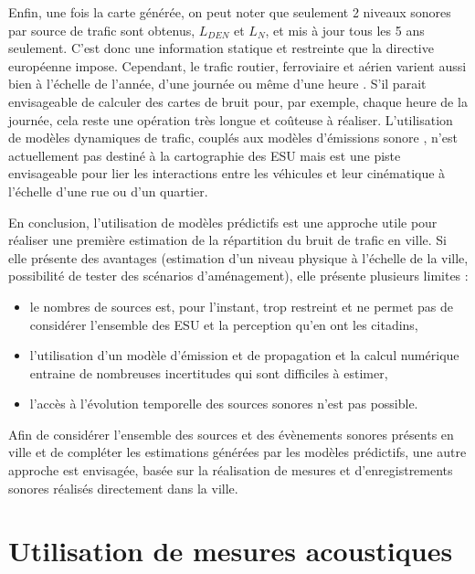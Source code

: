 
Enfin, une fois la carte générée, on peut noter que seulement 2 niveaux sonores par source de trafic sont obtenus, $L_{DEN}$ et $L_N$, et mis à jour tous les 5 ans seulement. C'est donc une information statique et restreinte que la directive européenne impose. Cependant, le trafic routier, ferroviaire et aérien varient aussi bien à l'échelle de l'année, d'une journée ou même d'une heure \cite{lv2015traffic}. S'il parait envisageable de calculer des cartes de bruit pour, par exemple, chaque heure de la journée, cela reste une opération très longue et coûteuse à réaliser.
L'utilisation de modèles dynamiques de trafic, couplés aux modèles d'émissions sonore  \cite{can2010traffic}, n'est actuellement pas destiné à la cartographie des ESU mais est une piste envisageable pour lier les interactions entre les véhicules et leur cinématique à l'échelle d'une rue ou d'un quartier.

En conclusion, l'utilisation de modèles prédictifs est une approche utile pour réaliser une première estimation de la répartition du bruit de trafic en ville. Si elle présente des avantages (estimation d'un niveau physique à l'échelle de la ville, possibilité de tester des scénarios d'aménagement), elle présente plusieurs limites :

\begin{itemize}
\item le nombres de  sources est, pour l'instant, trop restreint et ne permet pas de considérer l'ensemble des ESU et la perception qu'en ont les citadins,
\item l'utilisation d'un modèle d'émission et de propagation et la calcul numérique entraine de nombreuses incertitudes qui sont difficiles à estimer,
\item l'accès à l'évolution temporelle des sources sonores n'est pas possible.
\end{itemize}

Afin de considérer l'ensemble des sources et des évènements sonores présents en ville et de compléter les estimations générées par les modèles prédictifs, une autre approche est envisagée, basée sur la réalisation de mesures et d'enregistrements sonores réalisés directement dans la ville.

\section{Utilisation de mesures acoustiques}

